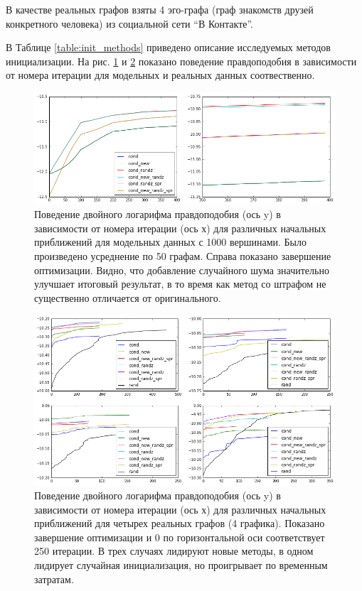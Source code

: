 \documentclass{ITaSconf}
\begin{document}
В качестве реальных графов взяты 4 эго-графа (граф знакомств друзей конкретного человека) из социальной сети ``В Контакте''.

В Таблице \ref{table:init_methods} приведено описание исследуемых методов инициализации.
На рис. \ref{fig:llh_init_model} и \ref{fig:llh_init_real} показано поведение правдоподобия в зависимости от номера итерации для модельных и реальных данных соотвественно. 
\begin{figure}[!h]
	\centering
	\includegraphics[width=\linewidth]{imgs/init_new_good.png}
	\caption{Поведение двойного логарифма правдоподобия (ось y) в зависимости от номера итерации (ось х) для различных начальных приближений для модельных данных \cite{lancichinetti2009benchmarks} с 1000 вершинами. Было произведено усреднение по 50 графам. Справа показано завершение оптимизации. Видно, что добавление случайного шума значительно улучшает итоговый результат, в то время как метод со штрафом не существенно отличается от оригинального.}
	\label{fig:llh_init_model}
\end{figure}
\begin{figure}[!h]
	\centering
	\includegraphics[width=\linewidth]{imgs/init_llh_real.png}
	\caption{Поведение двойного логарифма правдоподобия (ось y) в зависимости от номера итерации (ось х) для различных начальных приближений для четырех реальных графов (4 графика). Показано завершение оптимизации и 0 по горизонтальной оси соответствует 250 итерации. В трех случаях лидируют новые методы, в одном лидирует случайная инициализация, но проигрывает по временным затратам. }
	\label{fig:llh_init_real}
\end{figure}
\end{document}
